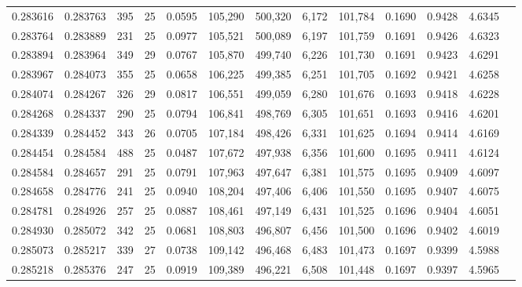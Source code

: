 \begin{tabular}{rrrrrrrrrrrrr}
0.283616 & 0.283763 &   395 &  25 &                                     0.0595 & 105,290 & 500,320 &   6,172 & 101,784 & 0.1690 & 0.9428 & 4.6345 \\
0.283764 & 0.283889 &   231 &  25 &                                     0.0977 & 105,521 & 500,089 &   6,197 & 101,759 & 0.1691 & 0.9426 & 4.6323 \\
0.283894 & 0.283964 &   349 &  29 &                                     0.0767 & 105,870 & 499,740 &   6,226 & 101,730 & 0.1691 & 0.9423 & 4.6291 \\
0.283967 & 0.284073 &   355 &  25 &                                     0.0658 & 106,225 & 499,385 &   6,251 & 101,705 & 0.1692 & 0.9421 & 4.6258 \\
0.284074 & 0.284267 &   326 &  29 &                                     0.0817 & 106,551 & 499,059 &   6,280 & 101,676 & 0.1693 & 0.9418 & 4.6228 \\
0.284268 & 0.284337 &   290 &  25 &                                     0.0794 & 106,841 & 498,769 &   6,305 & 101,651 & 0.1693 & 0.9416 & 4.6201 \\
0.284339 & 0.284452 &   343 &  26 &                                     0.0705 & 107,184 & 498,426 &   6,331 & 101,625 & 0.1694 & 0.9414 & 4.6169 \\
0.284454 & 0.284584 &   488 &  25 &                                     0.0487 & 107,672 & 497,938 &   6,356 & 101,600 & 0.1695 & 0.9411 & 4.6124 \\
0.284584 & 0.284657 &   291 &  25 &                                     0.0791 & 107,963 & 497,647 &   6,381 & 101,575 & 0.1695 & 0.9409 & 4.6097 \\
0.284658 & 0.284776 &   241 &  25 &                                     0.0940 & 108,204 & 497,406 &   6,406 & 101,550 & 0.1695 & 0.9407 & 4.6075 \\
0.284781 & 0.284926 &   257 &  25 &                                     0.0887 & 108,461 & 497,149 &   6,431 & 101,525 & 0.1696 & 0.9404 & 4.6051 \\
0.284930 & 0.285072 &   342 &  25 &                                     0.0681 & 108,803 & 496,807 &   6,456 & 101,500 & 0.1696 & 0.9402 & 4.6019 \\
0.285073 & 0.285217 &   339 &  27 &                                     0.0738 & 109,142 & 496,468 &   6,483 & 101,473 & 0.1697 & 0.9399 & 4.5988 \\
0.285218 & 0.285376 &   247 &  25 &                                     0.0919 & 109,389 & 496,221 &   6,508 & 101,448 & 0.1697 & 0.9397 & 4.5965 \\

\end{tabular}
